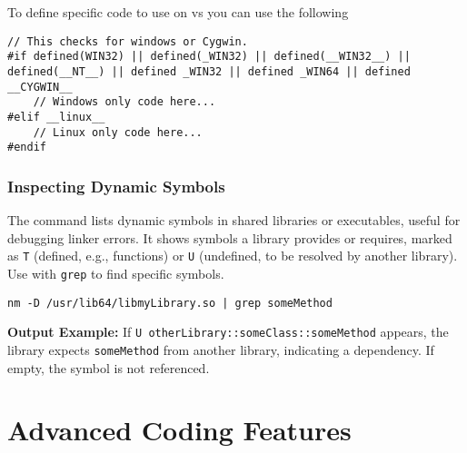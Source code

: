 To define specific code to use on  vs  you can use the following
\begin{lstlisting}
// This checks for windows or Cygwin.
#if defined(WIN32) || defined(_WIN32) || defined(__WIN32__) || defined(__NT__) || defined _WIN32 || defined _WIN64 || defined __CYGWIN__
	// Windows only code here...
#elif __linux__
	// Linux only code here...
#endif
\end{lstlisting}


\subsubsection{Inspecting Dynamic Symbols}
The  command lists dynamic symbols in shared libraries or executables, useful for debugging linker errors. It shows symbols a library provides or requires, marked as \texttt{T} (defined, e.g., functions) or \texttt{U} (undefined, to be resolved by another library). Use with \texttt{grep} to find specific symbols.

\begin{lstlisting}[style=terminalstyle]
nm -D /usr/lib64/libmyLibrary.so | grep someMethod
\end{lstlisting}

\textbf{Output Example:} If \texttt{U otherLibrary::someClass::someMethod} appears, the library expects \texttt{someMethod} from another library, indicating a dependency. If empty, the symbol is not referenced.

























\section{Advanced Coding Features}

